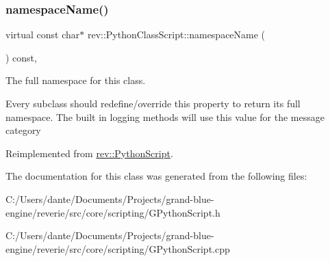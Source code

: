 \subsubsection{\texorpdfstring{namespaceName()}{namespaceName()}}
{\footnotesize\ttfamily virtual const char$\ast$ rev\+::\+Python\+Class\+Script\+::namespace\+Name (\begin{DoxyParamCaption}{ }\end{DoxyParamCaption}) const\hspace{0.3cm}{\ttfamily [inline]}, {\ttfamily [virtual]}}



The full namespace for this class. 

Every subclass should redefine/override this property to return its full namespace. The built in logging methods will use this value for the message category 

Reimplemented from \mbox{\hyperlink{classrev_1_1_python_script_ad8a903fd2749527913565f640e5239d6}{rev\+::\+Python\+Script}}.



The documentation for this class was generated from the following files\+:\begin{DoxyCompactItemize}
\item 
C\+:/\+Users/dante/\+Documents/\+Projects/grand-\/blue-\/engine/reverie/src/core/scripting/G\+Python\+Script.\+h\item 
C\+:/\+Users/dante/\+Documents/\+Projects/grand-\/blue-\/engine/reverie/src/core/scripting/G\+Python\+Script.\+cpp\end{DoxyCompactItemize}
